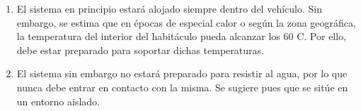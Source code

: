 \begin{enumerate}[resume, label=\textbf{\texttt{RNF-\arabic*}}]
  \item\label{nf:vehicle-env} El sistema en principio estará alojado siempre dentro
  del vehículo. Sin embargo, se estima que en épocas de especial calor o según la zona
  geográfica, la temperatura del interior del habitáculo pueda alcanzar los 60 \textdegree C.
  Por ello, debe estar preparado para soportar dichas temperaturas.
  \item\label{nf:water} El sistema sin embargo no estará preparado para resistir al
  agua, por lo que nunca debe entrar en contacto con la misma. Se sugiere pues que
  se sitúe en un entorno aislado.
\end{enumerate}